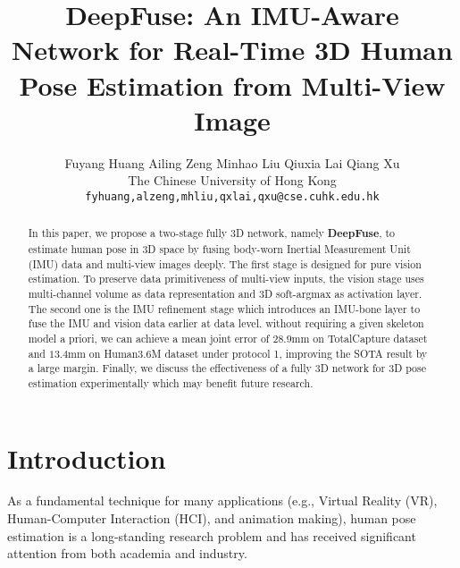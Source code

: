 \documentclass[10pt,twocolumn,letterpaper]{article}
\begin{document}
\title{DeepFuse: An IMU-Aware Network for Real-Time 3D Human Pose Estimation from Multi-View Image}

\author{Fuyang Huang \hspace{1cm} Ailing Zeng \hspace{1cm} Minhao Liu \hspace{1cm} Qiuxia Lai \hspace{1cm} Qiang Xu\\
The Chinese University of Hong Kong\\
{\tt\small fyhuang,alzeng,mhliu,qxlai,qxu@cse.cuhk.edu.hk}
}





\maketitle
\ifwacvfinal\thispagestyle{empty}\fi

\begin{abstract}


In this paper, we propose a two-stage fully 3D network, namely \textbf{DeepFuse}, to estimate human pose in 3D space by fusing body-worn Inertial Measurement Unit (IMU) data and multi-view images deeply. The first stage is designed for pure vision estimation. To preserve data primitiveness of multi-view inputs, the vision stage uses multi-channel volume as data representation and 3D soft-argmax as activation layer. The second one is the IMU refinement stage which introduces an IMU-bone layer to fuse the IMU and vision data earlier at data level. without requiring a given skeleton model a priori, we can achieve a mean joint error of $28.9$mm on TotalCapture dataset and $13.4$mm on Human3.6M dataset under protocol 1, improving the SOTA result by a large margin. Finally, we discuss the effectiveness of a fully 3D network for 3D pose estimation experimentally which may benefit future research.

\end{abstract}

\vspace{-0.5cm}
\section{Introduction}
As a fundamental technique for many applications (e.g., Virtual Reality (VR), Human-Computer Interaction (HCI), and animation making), human pose estimation is a long-standing research problem and has received significant attention from both academia and industry. 
\end{document}

